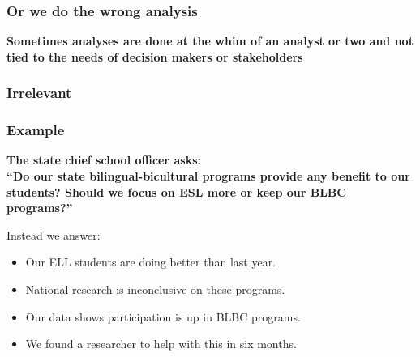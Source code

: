 \documentclass{beamer}
\begin{document}
\begin{frame}
\frametitle{Or we do the wrong analysis}
\begin{center}
\Huge \textbf{Sometimes analyses are done at the whim of an analyst or two and not tied to the needs of decision makers or stakeholders}
\end{center}
\end{frame}

{
\begin{frame}[plain]
\frametitle{Irrelevant}
\end{frame}
}

\begin{frame}
\frametitle{Example}
\begin{center}
\textbf{The state chief school officer asks: \\ 
``Do our state bilingual-bicultural programs provide any benefit to our students? Should we focus on ESL more or keep our BLBC programs?''}
\end{center}
\vspace{.1in}
Instead we answer:
\begin{itemize}
  \item Our ELL students are doing better than last year.
  \item National research is inconclusive on these programs.
  \item Our data shows participation is up in BLBC programs.
  \item We found a researcher to help with this in six months.
\end{itemize}
\end{frame}
\end{document}

